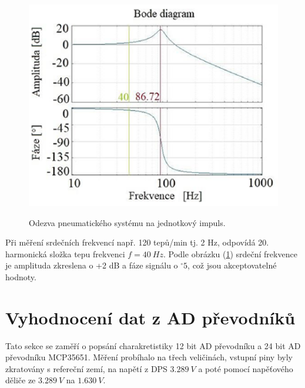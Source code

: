 \begin{figure}[H]
    \caption{Odezva pneumatického systému na jednotkový impuls.}
    \includegraphics[width=1\textwidth]{pictures/freq_char_pneu.png}
    \label{fig:pneu_freq_char}
\end{figure}
Při měření srdečních frekvencí např. 120 tepů/min tj. 2 Hz, odpovídá 20. harmonická složka tepu frekvenci $f = 40 \ Hz$. Podle obrázku (\ref{fig:pneu_freq_char}) srdeční frekvence je amplituda zkreslena o +2 dB a fáze signálu o $^\circ 5$, což jsou akceptovatelné hodnoty.

\section{Vyhodnocení dat z AD převodníků}
Tato sekce se zaměří o popsání charakretistiky 12 bit AD převodníku a 24 bit AD převodníku MCP35651. Měření probíhalo na třech veličinách, vstupní piny byly zkratovány s refereční zemí, na napětí z DPS $3.289 \ V$ a poté pomocí napěťového děliče ze $3.289 \ V$ na $1.630 \ V$.

